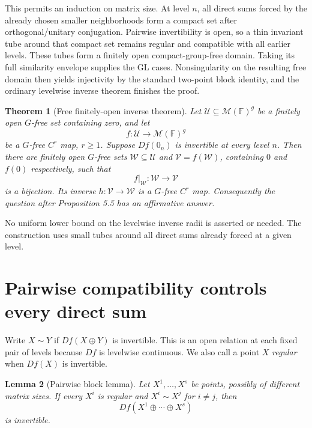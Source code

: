 \documentclass[11pt]{article}
\newtheorem{theorem}{Theorem}
\newtheorem{lemma}[theorem]{Lemma}
\newcommand{\M}{\mathcal M}
\newcommand{\U}{\mathcal U}
\newcommand{\W}{\mathcal W}
\newcommand{\V}{\mathcal V}
\newcommand{\F}{\mathbb F}
\newcommand{\op}{\mathbin{\oplus}}
\begin{document}
This permits an induction on matrix size.  At level $n$, all direct sums forced
by the already chosen smaller neighborhoods form a compact set after
orthogonal/unitary conjugation.  Pairwise invertibility is open, so a thin
invariant tube around that compact set remains regular and compatible with all
earlier levels.  These tubes form a finitely open compact-group-free domain.
Taking its full similarity envelope supplies the GL cases.  Nonsingularity on
the resulting free domain then yields injectivity by the standard two-point
block identity, and the ordinary levelwise inverse theorem finishes the proof.

\begin{theorem}[Free finitely-open inverse theorem]\label{thm:main}
Let $\U\subseteq\M(\F)^g$ be a finitely open $G$-free set containing zero,
and let
\[
 f:\U\longrightarrow\M(\F)^g
\]
be a $G$-free $C^r$ map, $r\geq1$.  Suppose $Df(0_n)$ is invertible at every
level $n$.  Then there are finitely open $G$-free sets $\W\subseteq\U$ and
$\V=f(\W)$, containing $0$ and $f(0)$ respectively, such that
\[
 f|_{\W}:\W\longrightarrow\V
\]
is a bijection.  Its inverse $h:\V\to\W$ is a $G$-free $C^r$ map.
Consequently the question after Proposition 5.5 has an affirmative answer.
\end{theorem}

No uniform lower bound on the levelwise inverse radii is asserted or needed.
The construction uses small tubes around all direct sums already forced at a
given level.

\section{Pairwise compatibility controls every direct sum}

Write $X\sim Y$ if $Df(X\op Y)$ is invertible.  This is an open relation at
each fixed pair of levels because $Df$ is levelwise continuous.  We also call
a point $X$ \emph{regular} when $Df(X)$ is invertible.

\begin{lemma}[Pairwise block lemma]\label{lem:block}
Let $X^1,\ldots,X^s$ be points, possibly of different matrix sizes.  If every
$X^i$ is regular and $X^i\sim X^j$ for $i\ne j$, then
\[
 Df(X^1\op\cdots\op X^s)
\]
is invertible.
\end{lemma}
\end{document}

